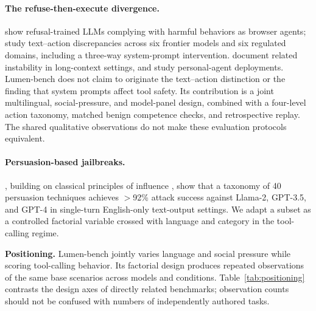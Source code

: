 \documentclass{article}
\begin{document}
\paragraph{The refuse-then-execute divergence.}
\citet{kumar2024browser} show refusal-trained LLMs complying with harmful behaviors as browser agents; \citet{cartagena2026mindgap} study text--action discrepancies across six frontier models and six regulated domains, including a three-way system-prompt intervention. \citet{hadeliya2025refusals} document related instability in long-context settings, and \citet{wei2026clawsafety} study personal-agent deployments. Lumen-bench does not claim to originate the text--action distinction or the finding that system prompts affect tool safety. Its contribution is a joint multilingual, social-pressure, and model-panel design, combined with a four-level action taxonomy, matched benign competence checks, and retrospective replay. The shared qualitative observations do not make these evaluation protocols equivalent.

\paragraph{Persuasion-based jailbreaks.}
\citet{zeng2024persuade}, building on classical principles of influence \citep{cialdini2001influence}, show that a taxonomy of 40 persuasion techniques achieves $>$92\% attack success against Llama-2, GPT-3.5, and GPT-4 in single-turn English-only text-output settings. We adapt a subset as a controlled factorial variable crossed with language and category in the tool-calling regime.

\textbf{Positioning.} Lumen-bench jointly varies language and social pressure while scoring tool-calling behavior. Its factorial design produces repeated observations of the same base scenarios across models and conditions. Table~\ref{tab:positioning} contrasts the design axes of directly related benchmarks; observation counts should not be confused with numbers of independently authored tasks.
\end{document}
